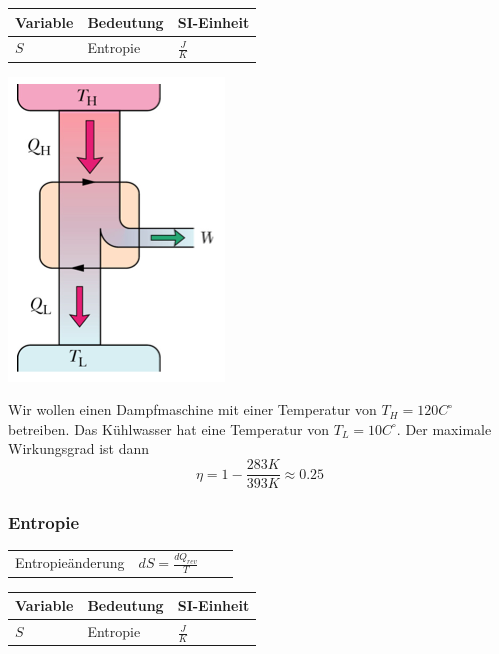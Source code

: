 \documentclass[
a4paper,
oneside,
landscape, 
8pt,
]{scrartcl}
\begin{document}
\begin{multicols*}{2}
\begin{tabbing}
	\begin{tabu} to \linewidth {l X l}
		Variable & Bedeutung & SI-Einheit \\
		\midrule
		$S$ &Entropie & $\frac{J}{K}$ \\
		\bottomrule
	\end{tabu}
\end{tabbing}

\begin{minipage}[h!]{0.5\linewidth}
	\includegraphics[width=0.4\linewidth]{images/carnot_machine}
\end{minipage}
\hfill
\begin{minipage}[h!]{0.5\linewidth}
Wir wollen einen Dampfmaschine mit einer Temperatur von $T_H=120C^\circ$ betreiben. Das Kühlwasser hat eine Temperatur von $T_L=10C^\circ$. Der maximale Wirkungsgrad ist dann
\[
	\eta = 1 - \frac{283K}{393 K} \approx 0.25 
\]
\end{minipage}

\vfill\null
\columnbreak

\subsubsection{Entropie}
\begin{tabbing}
	\begin{tabu} to \linewidth {l X l X}
		\toprule
		Entropieänderung & $dS = \frac{dQ_{rev}}{T}$  &  &  \\
	\end{tabu}
\end{tabbing}

\begin{tabbing}
	\begin{tabu} to \linewidth {l X l}
		Variable & Bedeutung & SI-Einheit \\
		\midrule
		$S$ &Entropie & $\frac{J}{K}$ \\
		\bottomrule
	\end{tabu}
\end{tabbing}


\end{multicols*}
\end{document}
